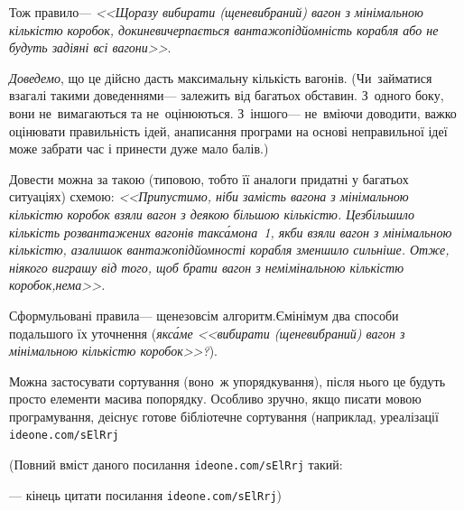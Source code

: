 \documentclass[14pt,a4paper]{extarticle}
\renewcommand{\baselinestretch}{1.3125}
\begin{document}
Тож правило\nolinebreak[3] --- \textsl{<<Щоразу вибирати (ще\nolinebreak[3] не\nolinebreak[3] вибраний) вагон з мінімальною кількістю коробок, доки\nolinebreak[3] не\nolinebreak[3] вичерпається вантажопідйомність корабля або не будуть задіяні всі вагони>>}.

\emph{Доведемо}, що це дійсно дасть максимальну кількість вагонів. (Чи~займатися взагалі такими доведеннями\nolinebreak[3] --- залежить від багатьох обставин. З~одного боку, вони не~вимагаються та не~оцінюються. З~іншого\nolinebreak[3] --- не~вміючи доводити, важко оцінювати правильність ідей, а\nolinebreak[3] написання програми на основі неправильної ідеї може забрати час і принести дуже мало балів.) 

Довести можна за такою (типовою, тобто її аналоги придатні у багатьох ситуаціях) схемою: \textsl{<<Припустимо, ніби замість вагона з мінімальною кількістю коробок взяли вагон з деякою більшою кількістю. Це\nolinebreak[3] збільшило кількість розвантажених вагонів так\nolinebreak[3] с\'{а}мо\nolinebreak[1] на~1, якби взяли вагон з мінімальною кількістю, а\nolinebreak[3] залишок вантажопідйомності корабля зменшило сильніше. Отже, ніякого виграшу від того, щоб брати вагон з немімінальною кількістю коробок,\nolinebreak[1] \mbox{нема}>>.} 


Сформульовані правила\nolinebreak[3] --- ще\nolinebreak[2] не\nolinebreak[3] зовсім алгоритм.\linebreak[1] Є\nolinebreak[3] мінімум два способи подальшого їх уточнення (\emph{як\nolinebreak[3] с\'{а}ме \textsl{<<вибирати (ще\nolinebreak[3] не\nolinebreak[3] вибраний) вагон з мінімальною кількістю коробок>>}?}).

Можна застосувати сортування (воно~ж упорядкування), після нього це будуть просто елементи масива по\nolinebreak[3] порядку. Особливо зручно, якщо писати мовою програмування, де\nolinebreak[2] існує готове бібліотечне сортування (наприклад, у\nolinebreak[3] реалізації 
\verb"ideone.com/sElRrj"


{\color{green}\begin{small}

\renewcommand{\baselinestretch}{0.875}

(Повний вміст даного посилання \verb"ideone.com/sElRrj" такий:

--- кінець цитати посилання \verb"ideone.com/sElRrj")

\end{small}}
\end{document}
